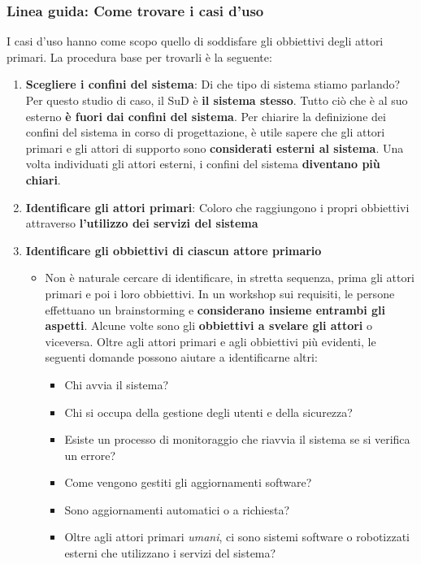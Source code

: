 \documentclass[12pt]{article}
\begin{document}
\subsubsection{Linea guida: Come trovare i casi d'uso}
I casi d'uso hanno come scopo quello di soddisfare gli obbiettivi degli attori primari. La procedura base per trovarli è la seguente:
\begin{enumerate}
    \item \textbf{Scegliere i confini del sistema}: Di che tipo di sistema stiamo parlando? Per questo studio di caso, il SuD è \textbf{il sistema stesso}.
    Tutto ciò che è al suo esterno \textbf{è fuori dai confini del sistema}. Per chiarire la definizione dei confini del sistema in corso di progettazione, è utile sapere che gli attori primari e gli attori di supporto sono \textbf{considerati esterni al sistema}.
    Una volta individuati gli attori esterni, i confini del sistema \textbf{diventano più chiari}.
    \item \textbf{Identificare gli attori primari}: Coloro che raggiungono i propri obbiettivi attraverso \textbf{l'utilizzo dei servizi del sistema}
    \item \textbf{Identificare gli obbiettivi di ciascun attore primario}
    \begin{itemize}
        \item Non è naturale cercare di identificare, in stretta sequenza, prima gli attori primari e poi i loro obbiettivi.
        In un workshop sui requisiti, le persone effettuano un brainstorming e \textbf{considerano insieme entrambi gli aspetti}.
        Alcune volte sono gli \textbf{obbiettivi a svelare gli attori} o viceversa.
        Oltre agli attori primari e agli obbiettivi più evidenti, le seguenti domande possono aiutare a identificarne altri:
        \begin{itemize}
            \item Chi avvia il sistema?
            \item Chi si occupa della gestione degli utenti e della sicurezza?
            \item Esiste un processo di monitoraggio che riavvia il sistema se si verifica un errore?
            \item Come vengono gestiti gli aggiornamenti software?
            \item Sono aggiornamenti automatici o a richiesta?
            \item Oltre agli attori primari \textit{umani}, ci sono sistemi software o robotizzati esterni che utilizzano i servizi del sistema?

\end{itemize}
\end{itemize}
\end{enumerate}
\end{document}
